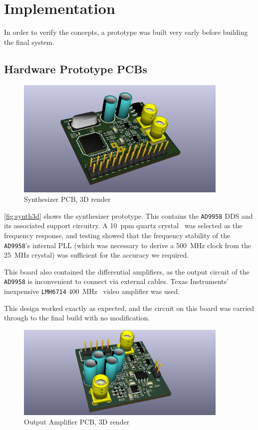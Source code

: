 \chapter{Implementation}

In order to verify the concepts, a prototype was built very early before building the
final system.

\section{Hardware Prototype PCBs}

\begin{figure}[H]
\centering
\includegraphics[width=4in]{synth3d.png}
\caption{Synthesizer PCB, 3D render}
\label{fig:synth3d}
\end{figure}

\autoref{fig:synth3d} shows the synthesizer prototype. This contains the \texttt{AD9958} DDS
and its associated support circuitry. A 10~ppm quartz crystal~\cite{txc-9c} was selected
as the frequency response, and testing showed that the frequency stability of the \texttt{AD9958}'s
internal PLL (which was necessary to derive a 500~MHz clock from the 25~MHz crystal) was
sufficient for the accuracy we required.

This board also contained the differential amplifiers, as the output circuit of the
\texttt{AD9958} is inconvenient to connect via external cables. Texas Instruments' inexpensive
\texttt{LMH6714} 400~MHz~\cite{lmh6714} video amplifier was used.

This design worked exactly as expected, and the circuit on this board was carried through to the
final build with no modification.

\begin{figure}[H]
\centering
\includegraphics[width=4in]{outamp3d.png}
\caption{Output Amplifier PCB, 3D render}
\label{fig:outamp3d}
\end{figure}

